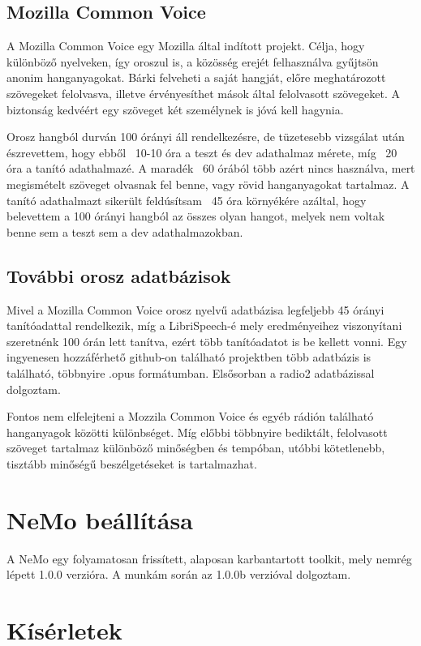 \subsection{Mozilla Common Voice}

A Mozilla Common Voice egy Mozilla által indított projekt. Célja, hogy különböző nyelveken, így oroszul is, a közösség erejét felhasználva gyűjtsön anonim hanganyagokat. Bárki felveheti a saját hangját, előre meghatározott szövegeket felolvasva, illetve érvényesíthet mások által felolvasott szövegeket. A biztonság kedvéért egy szöveget két személynek is jóvá kell hagynia.


Orosz hangból durván 100 órányi áll rendelkezésre, de tüzetesebb vizsgálat után észrevettem, hogy ebből ~10-10 óra a teszt és dev adathalmaz mérete, míg ~20 óra a tanító adathalmazé. A maradék ~60 órából több azért nincs használva, mert megismételt szöveget olvasnak fel benne, vagy rövid hanganyagokat tartalmaz. A tanító adathalmazt sikerült feldúsítsam ~45 óra környékére azáltal, hogy belevettem a 100 órányi hangból az összes olyan hangot, melyek nem voltak benne sem a teszt sem a dev adathalmazokban.


\subsection{További orosz adatbázisok}

Mivel a Mozilla Common Voice orosz nyelvű adatbázisa legfeljebb 45 órányi tanítóadattal rendelkezik, míg a LibriSpeech-é mely eredményeihez viszonyítani szeretnénk 100 órán lett tanítva, ezért több tanítóadatot is be kellett vonni. Egy ingyenesen hozzáférhető github-on található projektben több adatbázis is található, többnyire .opus formátumban. Elsősorban a radio2 adatbázissal dolgoztam.

Fontos nem elfelejteni a Mozzila Common Voice és egyéb rádión található hanganyagok közötti különbséget. Míg előbbi többnyire bediktált, felolvasott szöveget tartalmaz különböző minőségben és tempóban, utóbbi kötetlenebb, tisztább minőségű beszélgetéseket is tartalmazhat.



\section{NeMo beállítása}

A NeMo egy folyamatosan frissített, alaposan karbantartott toolkit, mely nemrég lépett 1.0.0 verzióra. A munkám során az 1.0.0b verzióval dolgoztam. 

\section{Kísérletek}